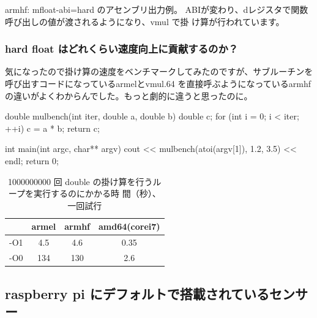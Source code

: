 \documentclass[mingoth,a4paper]{jsarticle}
\begin{document}
armhf: mfloat-abi=hard のアセンブリ出力例。
ABIが変わり、dレジスタで関数呼び出しの値が渡されるようになり、vmul で掛
け算が行われています。


\subsubsection{hard float はどれくらい速度向上に貢献するのか？}

気になったので掛け算の速度をベンチマークしてみたのですが、サブルーチンを
呼び出すコードになっているarmelとvmul.64 を直接呼ぶようになっているarmhf
の違いがよくわからんでした。もっと劇的に違うと思ったのに。

\begin{commandline}
double mulbench(int iter, double a, double b) {
  double c;
  for (int i = 0; i < iter; ++i) {
    c = a * b;
  }
  return c;
}

int main(int argc, char** argv) {
  cout << mulbench(atoi(argv[1]), 1.2, 3.5) << endl;
  return 0;
}
\end{commandline}

\begin{table}
 \caption{1000000000 回 double の掛け算を行うループを実行するのにかかる時
 間（秒）、一回試行}
\begin{center}
 \begin{tabular}{|c|c|c|c|}
 \hline
 & armel & armhf & amd64(corei7) \\
 \hline
 -O1 & 4.5 & 4.6 &  0.35 \\
 -O0 & 134 & 130 &  2.6 \\
 \hline
 \end{tabular}
\end{center}
\end{table}

\subsection{raspberry pi にデフォルトで搭載されているセンサー}
\end{document}
